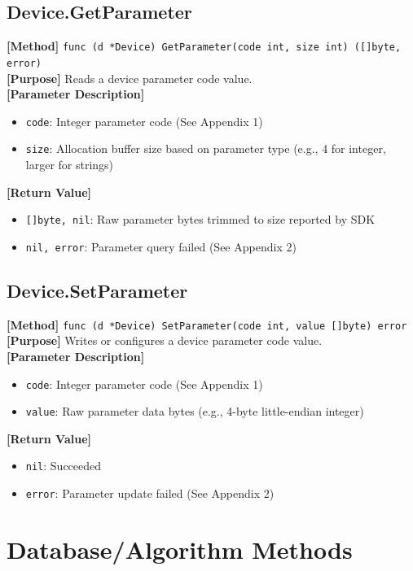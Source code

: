 \documentclass[11pt, a4paper]{article}
\begin{document}
\subsection{Device.GetParameter}
\textbf{[Method]} \texttt{func (d *Device) GetParameter(code int, size int) ([]byte, error)} \\
\textbf{[Purpose]} Reads a device parameter code value. \\
\textbf{[Parameter Description]} 
\begin{itemize}
    \item \texttt{code}: Integer parameter code (See Appendix 1)
    \item \texttt{size}: Allocation buffer size based on parameter type (e.g., 4 for integer, larger for strings)
\end{itemize}
\textbf{[Return Value]} 
\begin{itemize}
    \item \texttt{[]byte, nil}: Raw parameter bytes trimmed to size reported by SDK
    \item \texttt{nil, error}: Parameter query failed (See Appendix 2)
\end{itemize}

\subsection{Device.SetParameter}
\textbf{[Method]} \texttt{func (d *Device) SetParameter(code int, value []byte) error} \\
\textbf{[Purpose]} Writes or configures a device parameter code value. \\
\textbf{[Parameter Description]} 
\begin{itemize}
    \item \texttt{code}: Integer parameter code (See Appendix 1)
    \item \texttt{value}: Raw parameter data bytes (e.g., 4-byte little-endian integer)
\end{itemize}
\textbf{[Return Value]} 
\begin{itemize}
    \item \texttt{nil}: Succeeded
    \item \texttt{error}: Parameter update failed (See Appendix 2)
\end{itemize}

\section{Database/Algorithm Methods}
\end{document}
